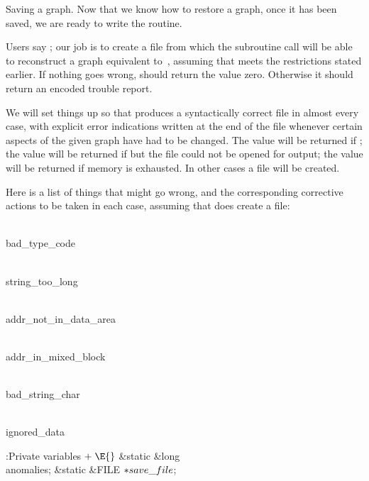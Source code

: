 Saving a graph. Now that we know how to restore a graph, once it has
been saved, we are ready to write the  routine.

Users say ; our job is to create a file
 from which the subroutine call 
will be able to reconstruct a graph equivalent to~, assuming that
 meets the restrictions stated earlier.  If nothing goes wrong,
 should return the value zero.  Otherwise it should return
an encoded trouble report.

We will set things up so that  produces
a syntactically correct file  in almost
every case, with explicit error indications written at the end of the file
whenever certain aspects of the given graph have had to be changed.
The value  will be returned if ; the value
 will be returned if  but the file  could not
be opened for output; the value  will be returned if memory is
exhausted. In other cases a file  will be created.

Here is a list of things that might go wrong, and the corresponding
corrective actions to be taken in each case, assuming that
 does create a file:

\Y\B\4\D\\{bad\_type\_code}\5
\par
\B\4\D\\{string\_too\_long}\5
\par
\B\4\D\\{addr\_not\_in\_data\_area}\5
\par
\B\4\D\\{addr\_in\_mixed\_block}\5
\par
\B\4\D\\{bad\_string\_char}\5
\par
\B\4\D\\{ignored\_data}\5
\par
\Y\B\4:Private variables\X${}\mathrel+\E{}$\6
\&{static} \&{long} \\{anomalies};\6
\&{static} \&{FILE} ${}{*}\\{save\_file}{}$;\par
\fi

